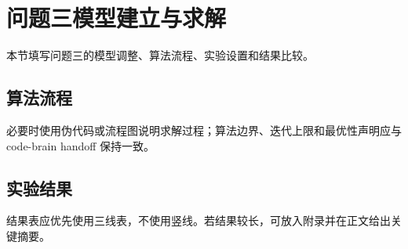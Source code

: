 \section{问题三模型建立与求解}
\label{sec:model-3}

本节填写问题三的模型调整、算法流程、实验设置和结果比较。

\subsection{算法流程}

必要时使用伪代码或流程图说明求解过程；算法边界、迭代上限和最优性声明应与 code-brain handoff 保持一致。

\subsection{实验结果}

结果表应优先使用三线表，不使用竖线。若结果较长，可放入附录并在正文给出关键摘要。
